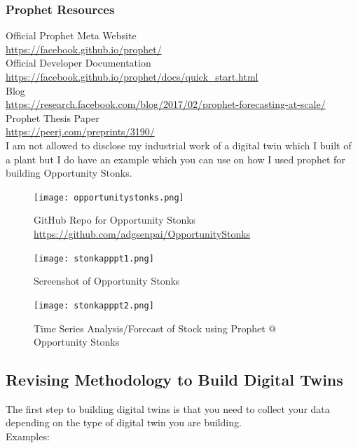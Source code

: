 \subsubsection{Prophet Resources}
Official Prophet Meta Website \\ 
\url{https://facebook.github.io/prophet/} \\
Official Developer Documentation \\
\url{https://facebook.github.io/prophet/docs/quick_start.html} \\
Blog \\
\url{https://research.facebook.com/blog/2017/02/prophet-forecasting-at-scale/}
Prophet Thesis Paper \\
\url{https://peerj.com/preprints/3190/} \\ 
I am not allowed to disclose my industrial work of a digital twin which I built of a plant but I do have an example which you can use on how I used prophet for building Opportunity Stonks. \\ 

\begin{figure}[H]
    \centering
    \texttt{[image: opportunitystonks.png]}
    \caption{GitHub Repo for Opportunity Stonks \url{https://github.com/adgsenpai/OpportunityStonks}}
    \label{fig:opportunitystonks}
\end{figure} 

\begin{figure}[H]
    \centering
    \texttt{[image: stonkapppt1.png]}
    \caption{Screenshot of Opportunity Stonks}
    \label{fig:opportunitystonks2}
\end{figure} 

\begin{figure}[H]
    \centering
    \texttt{[image: stonkapppt2.png]}
    \caption{Time Series Analysis/Forecast of Stock using Prophet @ Opportunity Stonks}
    \label{fig:opportunitystonks3}
\end{figure}

\subsection{Revising Methodology to Build Digital Twins}

The first step to building digital twins is that you need to collect your data depending on the type of digital twin you are building. \\

Examples: \\

